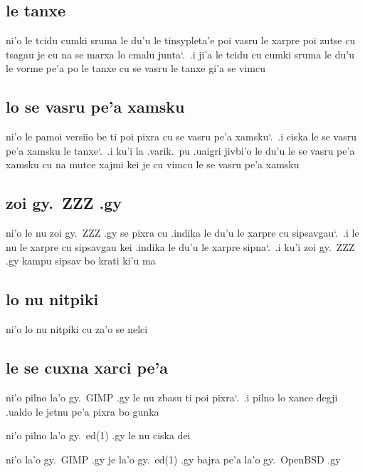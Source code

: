 \documentclass{report}
\newcommand\sds{\spacefactor\sfcode`.\ \space}
\begin{document}
\subsection{le tanxe}
ni'o le tcidu cumki sruma le du'u le tinsypleta'e poi vasru le xarpre poi zutse cu tsagau je cu na se marxa lo cmalu junta\sds  .i ji'a le tcidu cu cumki sruma le du'u le vorme pe'a po le tanxe cu se vasru le tanxe gi'a se vimcu

\subsection{lo se vasru pe'a xamsku}
ni'o le pamoi versiio be ti poi pixra cu se vasru pe'a xamsku\sds  .i ciska le se vasru pe'a xamsku le tanxe\sds  .i ku'i la .varik.\ pu .uaigri jivbi'o le du'u le se vasru pe'a xamsku cu na mutce xajmi kei je cu vimcu le se vasru pe'a xamsku

\subsection{zoi gy.\ ZZZ .gy}
ni'o le nu zoi gy.\ ZZZ .gy se pixra cu .indika le du'u le xarpre cu sipsavgau\sds  .i le nu le xarpre cu sipsavgau kei .indika le du'u le xarpre sipna\sds  .i ku'i zoi gy.\ ZZZ .gy kampu sipsav bo krati ki'u ma

\subsection{lo nu nitpiki}
ni'o lo nu nitpiki cu za'o se nelci

\subsection{le se cuxna xarci pe'a}
ni'o pilno la'o gy.\ GIMP .gy le nu zbasu ti poi pixra\sds  .i pilno lo xance degji .ualdo le jetnu pe'a pixra bo gunka

ni'o pilno la'o gy.\ ed(1) .gy le nu ciska dei

ni'o la'o gy.\ GIMP .gy je la'o gy.\ ed(1) .gy bajra pe'a la'o gy.\ OpenBSD .gy
\end{document}
